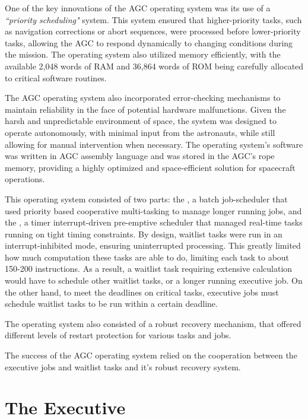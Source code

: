 One of the key innovations of the AGC operating system was its use of a
\textit{``priority scheduling"} system. This system ensured that higher-priority tasks,
such as navigation corrections or abort sequences, were processed before lower-priority
tasks, allowing the AGC to respond dynamically to changing conditions during the
mission. The operating system also utilized memory efficiently, with the available
2,048 words of RAM and 36,864 words of ROM being carefully allocated to critical
software routines.

The AGC operating system also incorporated error-checking mechanisms to maintain
reliability in the face of potential hardware malfunctions. Given the harsh and
unpredictable environment of space, the system was designed to operate autonomously,
with minimal input from the astronauts, while still allowing for manual intervention
when necessary. The operating system’s software was written in AGC assembly language
and was stored in the AGC’s rope memory, providing a highly optimized and
space-efficient solution for spacecraft operations.

This operating system consisted of two parts: the , a batch
job-scheduler that used priority based cooperative multi-tasking to manage longer
running jobs, and the , a timer interrupt-driven pre-emptive scheduler
that managed real-time tasks running on tight timing constraints. By design, waitlist
tasks were run in an interrupt-inhibited mode, ensuring uninterrupted processing. This
greatly limited how much computation these tasks are able to do, limiting each task to
about 150-200 instructions. As a result, a waitlist task requiring extensive
calculation would have to schedule other waitlist tasks, or a longer running executive
job. On the other hand, to meet the deadlines on critical tasks, executive jobs must
schedule waitlist tasks to be run within a certain deadline. 

The operating system also consisted of a robust recovery mechanism, that offered
different levels of restart protection for various tasks and jobs. 

The success of the AGC operating system relied on the cooperation between the executive
jobs and waitlist tasks and it's robust recovery system.


\section{The Executive}

